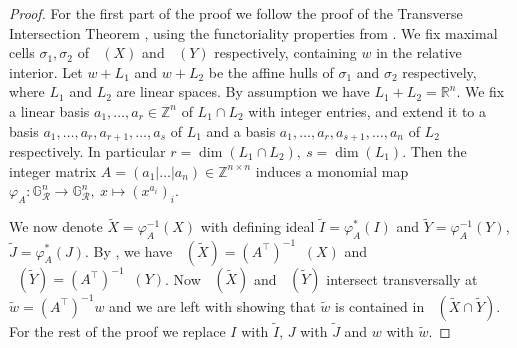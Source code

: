 \documentclass{article}
\theoremstyle{definition}
\DeclareMathOperator{\Tropw}{Trop_\mathcal{C}^+}
\newcommand{\R}{\mathbb{R}}
\newcommand{\RR}{\mathcal{R}}
\begin{document}
\begin{proof}
    For the first part of the proof we follow the proof of the Transverse Intersection Theorem \cite[Theorem 3.4.12]{maclagan2015introduction}, using the functoriality properties from .
    We fix maximal cells $\sigma_1, \sigma_2$ of $\Tropw(X)$ and $\Tropw(Y)$ respectively, containing $w$ in the relative interior. Let $w+L_1$ and $w+L_2$ be the affine hulls of $\sigma_1$ and $\sigma_2$ respectively, where $L_1$ and $L_2$ are linear spaces.
    By assumption we have $L_1+L_2 = \R^n$.
    We fix a linear basis $a_1, \dots, a_r \in \mathbb{Z}^n$  of $L_1 \cap L_2$ with integer entries, and extend it to a basis 
    $a_1, \dots, a_r, a_{r+1}, \dots,  a_{s}$ of $L_1$ and a basis
    $a_1, \dots, a_r, a_{s+1}, \dots, a_n$ of $L_2$ respectively. In particular $r = \operatorname{dim}(L_1 \cap L_2), \ s = \operatorname{dim}(L_1).$
    Then the integer matrix $A = (a_1| \dots |a_n) \in \mathbb{Z}^{n \times n}$
    induces a monomial map $\varphi_A \colon\mathbb{G}^n_\RR \longrightarrow \mathbb{G}^n_\RR, \ x \longmapsto (x^{a_i})_i$.


    We now denote $\widetilde{X} = \varphi_A^{-1}(X)$ with defining ideal $\widetilde{I} = \varphi_A^*(I)$ and $\widetilde{Y} = \varphi_A^{-1}(Y)$, $\widetilde{J} = \varphi_A^*(J)$.
    By , we have $\Tropw(\widetilde{X}) = (A^\top)^{-1} \Tropw(X)$ and $ \Tropw(\widetilde{Y}) = (A^\top)^{-1} \Tropw(Y)$. Now $\Tropw(\widetilde{X})$ and $\Tropw(\widetilde{Y})$ intersect transversally at $\widetilde{w} = (A^\top)^{-1}w$ and we are left with showing that $\widetilde{w}$ is contained in $\Tropw(\widetilde X \cap \widetilde Y)$. For the rest of the proof we replace $I$ with $\widetilde{I}$, $J$ with $\widetilde{J}$ and $w$ with $\widetilde{w}$.



\end{proof}
\end{document}
